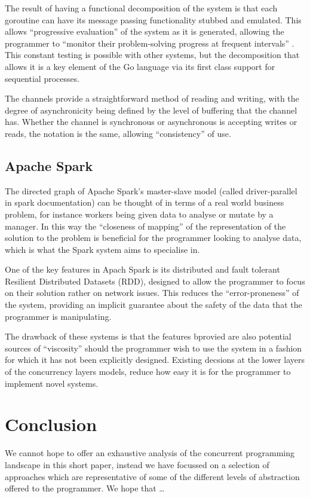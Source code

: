 \documentclass{sig-alternate}
\begin{document}
The result of having a functional decomposition of the system is that each goroutine can have its message passing functionality stubbed and emulated. This allows ``progressive evaluation'' of the system as it is generated, allowing the programmer to ``monitor their problem-solving progress at frequent intervals'' \cite{enpl}. This constant testing is possible with other systems, but the decomposition that allows it is a key element of the Go language via its first class support for sequential processes.

The channels provide a straightforward method of reading and writing, with the degree of asynchronicity being defined by the level of buffering that the channel has. Whether the channel is synchronous or asynchronous is accepting writes or reads, the notation is the same, allowing ``consistency'' of use.

\subsection{Apache Spark}
The directed graph of Apache Spark's master-slave model (called driver-parallel in spark documentation) can be thought of in terms of a real world business problem, for instance workers being given data to analyse or mutate by a manager. In this way the ``closeness of mapping'' of the representation of the solution to the problem is beneficial for the programmer looking to analyse data, which is what the Spark system aims to specialise in.

One of the key features in Apach Spark is its distributed and fault tolerant Resilient Distributed Datasets (RDD), designed to allow the programmer to focus on their solution rather on network issues. This reduces the ``error-proneness'' of the system, providing an implicit guarantee about the safety of the data that the programmer is manipulating. 

The drawback of these systems is that the features bprovied are also potential sources of ``viscosity'' should the programmer wish to use the system in a fashion for which it has not been explicitly designed. Existing decsions at the lower layers of the concurrency layers models, reduce how easy it is for the programmer to implement novel systems.

\section{Conclusion}
We cannot hope to offer an exhaustive analysis of the concurrent programming landscape in this short paper, instead we have focussed on a selection of approaches which are representative of some of the different levels of abstraction offered to the programmer. We hope that \ldots



\end{document}
